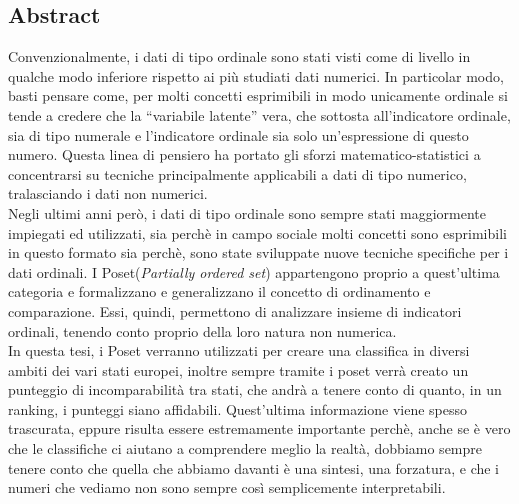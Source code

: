 \documentclass[a4paper,12pt, openright]{report}
\newcommand\blankpage{%
    \null
    \thispagestyle{empty}%
    \addtocounter{page}{-1}%
    \newpage}
\begin{document}
\begin{center}
    \chapter*{\centering Abstract}
    Convenzionalmente, i dati di tipo ordinale sono stati visti come di livello in qualche modo inferiore rispetto ai più studiati
    dati numerici. In particolar modo, basti pensare come, per molti concetti esprimibili in modo unicamente ordinale si tende a credere che 
    la “variabile latente” vera, che sottosta all’indicatore ordinale, sia di tipo numerale e l’indicatore ordinale sia 
    solo un’espressione di questo numero. Questa linea di pensiero ha portato gli sforzi 
    matematico-statistici a concentrarsi su tecniche principalmente applicabili a dati di tipo numerico, 
    tralasciando i dati non numerici. \\
    Negli ultimi anni però, i dati di tipo ordinale sono sempre stati maggiormente impiegati ed utilizzati, sia perchè in campo 
    sociale molti concetti sono esprimibili in questo formato sia perchè, sono state sviluppate nuove tecniche 
    specifiche per i dati ordinali. 
    I Poset(\textit{Partially ordered set}) appartengono proprio a quest’ultima categoria e formalizzano e generalizzano il 
    concetto di ordinamento e comparazione. Essi, quindi, permettono di analizzare insieme di indicatori ordinali, 
    tenendo conto proprio della loro natura non numerica. \\ In questa tesi, i Poset verranno utilizzati per creare una 
    classifica in diversi ambiti dei vari stati europei, inoltre sempre tramite i poset verrà creato un punteggio di
    incomparabilità tra stati, che andrà a tenere conto di quanto, in un ranking, i punteggi siano affidabili. 
    Quest'ultima informazione viene spesso trascurata, eppure risulta essere estremamente importante perchè, 
    anche se è vero che le classifiche ci aiutano a comprendere meglio la realtà, dobbiamo sempre tenere conto che quella che abbiamo davanti è una sintesi, 
    una forzatura, e che i numeri che vediamo non sono sempre così semplicemente interpretabili.  
\end{center}

\afterpage{\blankpage}


\tableofcontents





\newpage



\afterpage{\blankpage}
\end{document}
